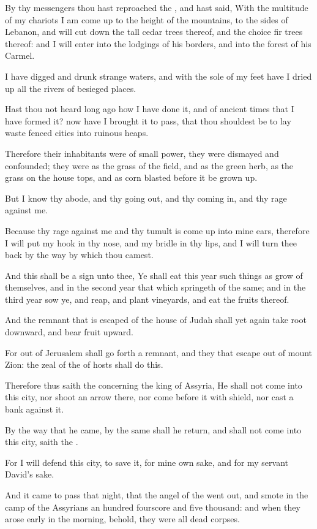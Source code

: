\verse By thy messengers thou hast reproached the \LORD, and hast said, With the multitude of my chariots I am come up to the height of the mountains, to the sides of Lebanon, and will cut down the tall cedar trees thereof, and the choice fir trees thereof: and I will enter into the lodgings of his borders, and into the forest of his Carmel.

\verse I have digged and drunk strange waters, and with the sole of my feet have I dried up all the rivers of besieged places.

\verse Hast thou not heard long ago how I have done it, and of ancient times that I have formed it? now have I brought it to pass, that thou shouldest be to lay waste fenced cities into ruinous heaps.

\verse Therefore their inhabitants were of small power, they were dismayed and confounded; they were as the grass of the field, and as the green herb, as the grass on the house tops, and as corn blasted before it be grown up.

\verse But I know thy abode, and thy going out, and thy coming in, and thy rage against me.

\verse Because thy rage against me and thy tumult is come up into mine ears, therefore I will put my hook in thy nose, and my bridle in thy lips, and I will turn thee back by the way by which thou camest.

\verse And this shall be a sign unto thee, Ye shall eat this year such things as grow of themselves, and in the second year that which springeth of the same; and in the third year sow ye, and reap, and plant vineyards, and eat the fruits thereof.

\verse And the remnant that is escaped of the house of Judah shall yet again take root downward, and bear fruit upward.

\verse For out of Jerusalem shall go forth a remnant, and they that escape out of mount Zion: the zeal of the \LORD of hosts shall do this.

\verse Therefore thus saith the \LORD concerning the king of Assyria, He shall not come into this city, nor shoot an arrow there, nor come before it with shield, nor cast a bank against it.

\verse By the way that he came, by the same shall he return, and shall not come into this city, saith the \LORD.

\verse For I will defend this city, to save it, for mine own sake, and for my servant David's sake.

\verse And it came to pass that night, that the angel of the \LORD went out, and smote in the camp of the Assyrians an hundred fourscore and five thousand: and when they arose early in the morning, behold, they were all dead corpses.

